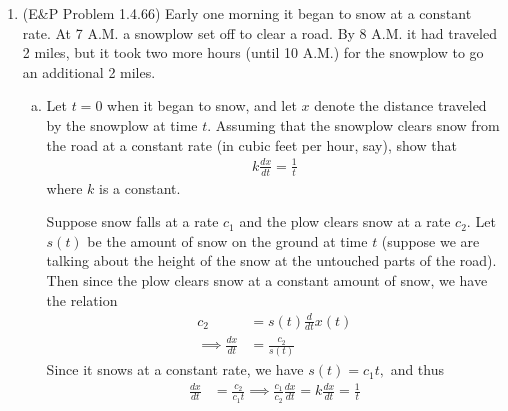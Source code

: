 \documentclass{article}
\begin{document}
\begin{enumerate}
		\newpage
	\item (E\&P Problem 1.4.66) Early one morning it began to snow at a constant rate. At 7 A.M. a snowplow set off to clear a road. By 8 A.M. it had traveled 2 miles, but it took two more hours (until 10 A.M.) for the snowplow to go an additional 2 miles.
		\begin{enumerate}[(a)]
			\item Let $t=0$ when it began to snow, and let $x$ denote the distance traveled by the snowplow at time $t.$ Assuming that the snowplow clears snow from the road at a constant rate (in cubic feet per hour, say), show that
				\begin{align*}
					k\frac{dx}{dt} = \frac{1}{t}
				\end{align*}
				where $k$ is a constant.
				\begin{soln}
					Suppose snow falls at a rate $c_1$ and the plow clears snow at a rate $c_2.$ Let $s(t)$ be the amount of snow on the ground at time $t$ (suppose we are talking about the height of the snow at the untouched parts of the road). Then since the plow clears snow at a constant amount of snow, we have the relation
					\begin{align*}
						c_2 &= s(t) \frac{d}{dt} x(t) \\
						\implies \frac{dx}{dt} &= \frac{c_2}{s(t)}
					\end{align*}
					Since it snows at a constant rate, we have $s(t)=c_1t,$ and thus
					\begin{align*}
						\frac{dx}{dt} &= \frac{c_2}{c_1t} \implies \frac{c_1}{c_2}\frac{dx}{dt} = k\frac{dx}{dt} = \frac{1}{t}
					\end{align*}
				\end{soln}


\end{enumerate}
\end{enumerate}
\end{document}
